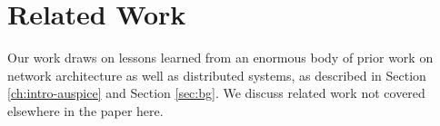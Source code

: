 %





\vspace{-0.1in}
\section{Related Work}
\label{sec:related}


Our work draws on lessons learned from an enormous body of prior work on network architecture as well as distributed systems, as described in Section \ref{ch:intro-auspice} and Section \ref{sec:bg}. We discuss related work not covered elsewhere in the paper here.


